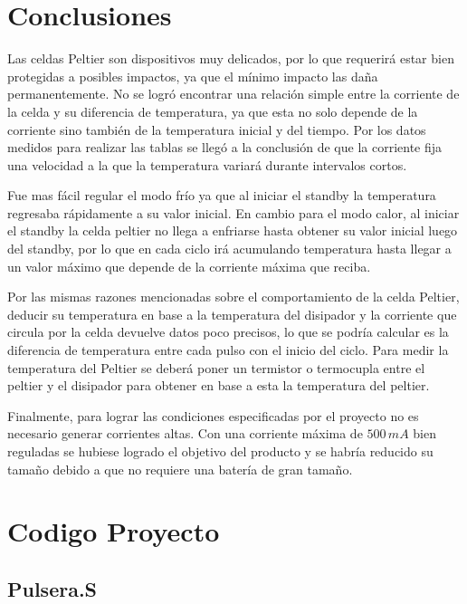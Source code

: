 \documentclass[10pt,spanish,a4paper,openany,notitlepage]{article}
\begin{document}
\section{Conclusiones}

Las celdas Peltier son dispositivos muy delicados, por lo que requerirá
estar bien protegidas a posibles impactos, ya que el mínimo impacto
las daña permanentemente. 
No se logró encontrar una relación simple entre la corriente de la celda
y su diferencia de temperatura, ya que esta no solo depende de la corriente
sino también de la temperatura inicial y del tiempo. Por los datos medidos para realizar
las tablas se llegó a la conclusión de que la corriente fija una velocidad
a la que la temperatura variará durante intervalos cortos.

Fue mas fácil regular el modo frío ya que al iniciar el standby la
temperatura regresaba rápidamente a su valor inicial. En cambio para el
modo calor, al iniciar el standby la celda peltier no llega a enfriarse
hasta obtener su valor inicial luego del standby, por lo que en cada ciclo
irá acumulando temperatura hasta llegar a un valor máximo que depende
de la corriente máxima que reciba.

Por las mismas razones mencionadas sobre el comportamiento de la celda Peltier,
deducir su temperatura en base a la temperatura del disipador y la corriente
que circula por la celda devuelve datos poco precisos, lo que se podría calcular
es la diferencia de temperatura entre cada pulso con el inicio del ciclo.
Para medir la temperatura del Peltier se deberá poner un termistor o termocupla
entre el peltier y el disipador para obtener en base a esta la temperatura del
peltier.

Finalmente, para lograr las condiciones especificadas por el proyecto
no es necesario generar corrientes altas. Con una corriente máxima de
$500\, \unit{mA}$ bien reguladas se hubiese logrado el objetivo del producto
y se habría reducido su tamaño debido a que no requiere una batería de
gran tamaño.

\appendix 

\newpage
\section{Codigo Proyecto}
\subsection{Pulsera.S}

\newpage
\lstset{language=Make}
\end{document}
